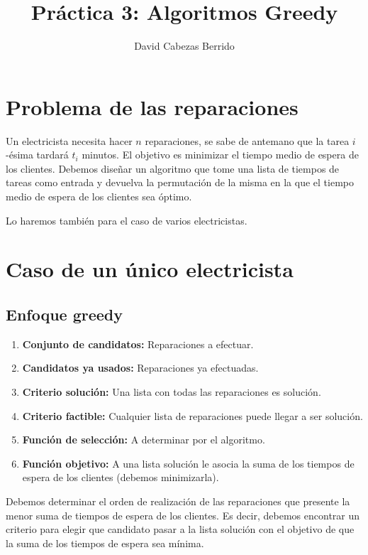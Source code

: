 \documentclass[a4]{article}
\author{David Cabezas Berrido}
\date{\vspace{-5mm}}
\title{\huge Práctica 3: Algoritmos Greedy \HRule\vspace{-4mm}}
\begin{document}
\maketitle
\vspace{20mm}
\tableofcontents
\newpage

\section{Problema de las reparaciones}
Un electricista necesita hacer $n$ reparaciones, se sabe de antemano
que la tarea $i$-ésima tardará $t_i$ minutos. El objetivo es minimizar
el tiempo medio de espera de los clientes. Debemos diseñar un
algoritmo que tome una lista de tiempos de tareas como entrada y
devuelva la permutación de la misma en la que el tiempo medio de
espera de los clientes sea óptimo.

Lo haremos también para el caso de varios electricistas.

\section{Caso de un único electricista}

\subsection{Enfoque greedy}
\begin{enumerate}
\item \textbf{Conjunto de candidatos:} Reparaciones a efectuar.
\item \textbf{Candidatos ya usados:} Reparaciones ya efectuadas.
\item \textbf{Criterio solución:} Una lista con todas las reparaciones
  es solución.
\item \textbf{Criterio factible:} Cualquier lista de reparaciones
  puede llegar a ser solución.
\item \textbf{Función de selección:} A determinar por el algoritmo.
\item \textbf{Función objetivo:} A una lista solución le asocia la
  suma de los tiempos de espera de los clientes (debemos minimizarla).
\end{enumerate}

Debemos determinar el orden de realización de las reparaciones que
presente la menor suma de tiempos de espera de los clientes. Es decir,
debemos encontrar un criterio para elegir que candidato pasar a la
lista solución con el objetivo de que la suma de los tiempos de espera
sea mínima.
\end{document}

